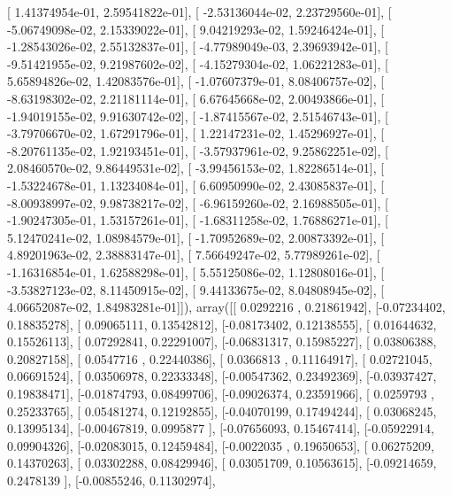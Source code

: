 \documentclass{article}
\begin{document}
       [  1.41374954e-01,   2.59541822e-01],
       [ -2.53136044e-02,   2.23729560e-01],
       [ -5.06749098e-02,   2.15339022e-01],
       [  9.04219293e-02,   1.59246424e-01],
       [ -1.28543026e-02,   2.55132837e-01],
       [ -4.77989049e-03,   2.39693942e-01],
       [ -9.51421955e-02,   9.21987602e-02],
       [ -4.15279304e-02,   1.06221283e-01],
       [  5.65894826e-02,   1.42083576e-01],
       [ -1.07607379e-01,   8.08406757e-02],
       [ -8.63198302e-02,   2.21181114e-01],
       [  6.67645668e-02,   2.00493866e-01],
       [ -1.94019155e-02,   9.91630742e-02],
       [ -1.87415567e-02,   2.51546743e-01],
       [ -3.79706670e-02,   1.67291796e-01],
       [  1.22147231e-02,   1.45296927e-01],
       [ -8.20761135e-02,   1.92193451e-01],
       [ -3.57937961e-02,   9.25862251e-02],
       [  2.08460570e-02,   9.86449531e-02],
       [ -3.99456153e-02,   1.82286514e-01],
       [ -1.53224678e-01,   1.13234084e-01],
       [  6.60950990e-02,   2.43085837e-01],
       [ -8.00938997e-02,   9.98738217e-02],
       [ -6.96159260e-02,   2.16988505e-01],
       [ -1.90247305e-01,   1.53157261e-01],
       [ -1.68311258e-02,   1.76886271e-01],
       [  5.12470241e-02,   1.08984579e-01],
       [ -1.70952689e-02,   2.00873392e-01],
       [  4.89201963e-02,   2.38883147e-01],
       [  7.56649247e-02,   5.77989261e-02],
       [ -1.16316854e-01,   1.62588298e-01],
       [  5.55125086e-02,   1.12808016e-01],
       [ -3.53827123e-02,   8.11450915e-02],
       [  9.44133675e-02,   8.04808945e-02],
       [  4.06652087e-02,   1.84983281e-01]]), array([[ 0.0292216 ,  0.21861942],
       [-0.07234402,  0.18835278],
       [ 0.09065111,  0.13542812],
       [-0.08173402,  0.12138555],
       [ 0.01644632,  0.15526113],
       [ 0.07292841,  0.22291007],
       [-0.06831317,  0.15985227],
       [ 0.03806388,  0.20827158],
       [ 0.0547716 ,  0.22440386],
       [ 0.0366813 ,  0.11164917],
       [ 0.02721045,  0.06691524],
       [ 0.03506978,  0.22333348],
       [-0.00547362,  0.23492369],
       [-0.03937427,  0.19838471],
       [-0.01874793,  0.08499706],
       [-0.09026374,  0.23591966],
       [ 0.0259793 ,  0.25233765],
       [ 0.05481274,  0.12192855],
       [-0.04070199,  0.17494244],
       [ 0.03068245,  0.13995134],
       [-0.00467819,  0.0995877 ],
       [-0.07656093,  0.15467414],
       [-0.05922914,  0.09904326],
       [-0.02083015,  0.12459484],
       [-0.0022035 ,  0.19650653],
       [ 0.06275209,  0.14370263],
       [ 0.03302288,  0.08429946],
       [ 0.03051709,  0.10563615],
       [-0.09214659,  0.2478139 ],
       [-0.00855246,  0.11302974],
\end{document}
